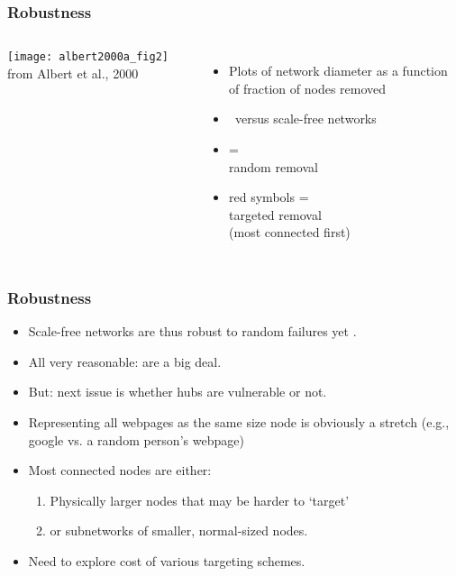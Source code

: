\begin{frame}[label=]
 \frametitle{Robustness}  

 \begin{columns}
   \texttt{[image: albert2000a\_fig2]}
   {\tiny from Albert et al., 2000}
   \begin{itemize}
   \item 
     Plots of network diameter as a function of fraction of nodes removed
   \item 
     \erdosrenyi\ versus scale-free networks
   \item
    = \\
   {random} removal
   \item
   \alert{red symbols} = \\
   {targeted} removal \\
   (most connected first)
   \end{itemize}

 \end{columns}

\end{frame}


\begin{frame}[label=]
  \frametitle{Robustness}  
  
  \begin{itemize}
  \item<1->
    Scale-free networks are thus \alert{robust to random failures}
    yet .
  \item<2-> 
    All very reasonable:  are a big deal.
  \item<3-> 
    \alert{But}: next issue is whether hubs are vulnerable or not.
  \item<4-> 
    Representing all webpages as the same size node is obviously
    a stretch (e.g., google vs. a random person's webpage)
  \item<5-> 
    Most connected nodes are either:
    \begin{enumerate}
    \item<6->
      Physically larger nodes that may be harder to `target'
    \item<7->
      or subnetworks of smaller, normal-sized nodes.
    \end{enumerate}
  \item<8-> 
    Need to explore cost of various targeting schemes.
  \end{itemize}
  
\end{frame}


